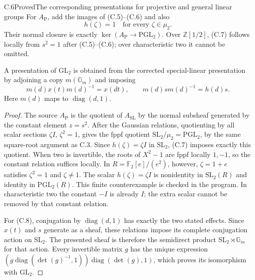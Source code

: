 \begin{statement}{C.6}{Proved}{The corresponding presentations for projective and general linear groups}
For $A_{\mathrm P}$, add the images of (C.5)--(C.6) and also
\[
 h(\zeta)=1\quad\text{for every }\zeta\in\mu_2.                  \tag{C.7}
\]
Their normal closure is exactly $\ker(A_{\mathrm P}\to\mathrm{PGL}_2)$.
Over $\mathbb Z[1/2]$, (C.7) follows locally from $s^2=1$ after
(C.5)--(C.6); over characteristic two it cannot be omitted.

A presentation of $\mathrm{GL}_2$ is obtained from the corrected
special-linear presentation by adjoining a copy $m(\mathbb G_m)$
and imposing
\[
 m(d)x(t)m(d)^{-1}=x(dt),\qquad
 m(d)s m(d)^{-1}=h(d)s.                                           \tag{C.8}
\]
Here $m(d)$ maps to $\operatorname{diag}(d,1)$.
\end{statement}
\begin{proof}
The source $A_{\mathrm P}$ is the quotient of $A_{\mathrm{SL}}$ by
the normal subsheaf generated by the constant element $z=s^2$.
After the Gaussian relations, quotienting by all scalar sections
$\zeta I$, $\zeta^2=1$, gives the fppf quotient
$\mathrm{SL}_2/\mu_2=\mathrm{PGL}_2$, by the same square-root
argument as C.3. Since $h(\zeta)=\zeta I$ in $\mathrm{SL}_2$,
(C.7) imposes exactly this quotient.
When two is invertible, the roots of $X^2-1$ are fppf locally
$1,-1$, so the constant relation suffices locally. In
$R=\mathbb F_2[e]/(e^2)$, however, $\zeta=1+e$ satisfies
$\zeta^2=1$ and $\zeta\ne1$. The scalar $h(\zeta)=\zeta I$
is nonidentity in $\mathrm{SL}_2(R)$ and identity in
$\mathrm{PGL}_2(R)$. This finite counterexample is checked in the
program. In characteristic two the constant $-I$ is already $I$;
the extra scalar cannot be removed by that constant relation.

For (C.8), conjugation by $\operatorname{diag}(d,1)$ has exactly
the two stated effects. Since $x(t)$ and $s$ generate as a sheaf,
these relations impose its complete conjugation action on
$\mathrm{SL}_2$. The presented sheaf is therefore the semidirect
product $\mathrm{SL}_2\rtimes\mathbb G_m$ for that action.
Every invertible matrix $g$ has the unique expression
$(g\operatorname{diag}(\det(g)^{-1},1))\operatorname{diag}(\det(g),1)$,
which proves its isomorphism with $\mathrm{GL}_2$.
\end{proof}

